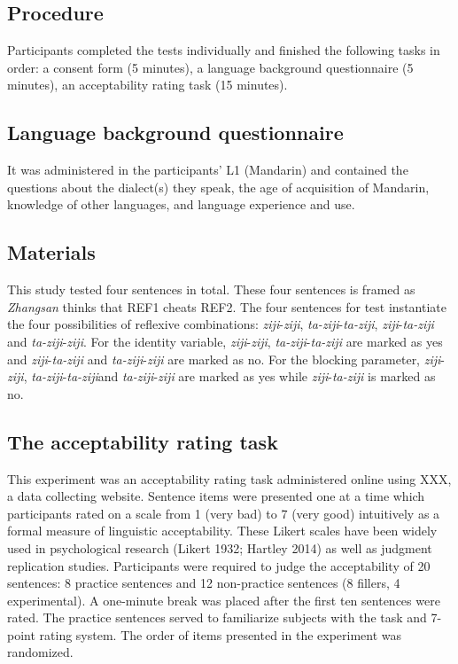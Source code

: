 \documentclass[
  english,
  man,floatsintext]{apa6}
\begin{document}
\hypertarget{procedure}{%
\subsection{Procedure}\label{procedure}}

Participants completed the tests individually and finished the following tasks in order: a consent form (5 minutes), a language background questionnaire (5 minutes), an acceptability rating task (15 minutes).

\hypertarget{language-background-questionnaire}{%
\subsection{Language background questionnaire}\label{language-background-questionnaire}}

It was administered in the participants' L1 (Mandarin) and contained the questions about the dialect(s) they speak, the age of acquisition of Mandarin, knowledge of other languages, and language experience and use.

\hypertarget{materials}{%
\subsection{Materials}\label{materials}}

This study tested four sentences in total. These four sentences is framed as \emph{Zhangsan} thinks that REF1 cheats REF2. The four sentences for test instantiate the four possibilities of reflexive combinations: \emph{ziji}-\emph{ziji}, \emph{ta-ziji}-\emph{ta-ziji}, \emph{ziji}-\emph{ta-ziji} and \emph{ta-ziji}-\emph{ziji}. For the identity variable, \emph{ziji}-\emph{ziji}, \emph{ta-ziji}-\emph{ta-ziji} are marked as yes and \emph{ziji}-\emph{ta-ziji} and \emph{ta-ziji}-\emph{ziji} are marked as no. For the blocking parameter, \emph{ziji}-\emph{ziji}, \emph{ta-ziji}-\emph{ta-ziji}and \emph{ta-ziji}-\emph{ziji} are marked as yes while \emph{ziji}-\emph{ta-ziji} is marked as no.

\hypertarget{the-acceptability-rating-task}{%
\subsection{The acceptability rating task}\label{the-acceptability-rating-task}}

This experiment was an acceptability rating task administered online using XXX, a data collecting website. Sentence items were presented one at a time which participants rated on a scale from 1 (very bad) to 7 (very good) intuitively as a formal measure of linguistic acceptability. These Likert scales have been widely used in psychological research (Likert 1932; Hartley 2014) as well as judgment replication studies. Participants were required to judge the acceptability of 20 sentences: 8 practice sentences and 12 non-practice sentences (8 fillers, 4 experimental). A one-minute break was placed after the first ten sentences were rated. The practice sentences served to familiarize subjects with the task and 7-point rating system. The order of items presented in the experiment was randomized.
\end{document}
